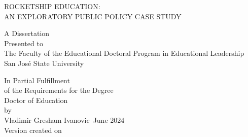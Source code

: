 
\begin{vplace}%
\begin{center}

  ROCKETSHIP EDUCATION:\\\vspace{1ex}
  AN EXPLORATORY PUBLIC POLICY CASE STUDY\\
\vspace{2\baselineskip}

A Dissertation\\
Presented to\\
The Faculty of the Educational Doctoral Program in Educational Leadership\\
San José State University\\
\vspace{2\baselineskip}

In Partial Fulfillment\\
of the Requirements for the Degree\\
Doctor of Education\\
\vspace{2\baselineskip}
by\\
Vladimir Gresham Ivanovic\
June 2024\\

\vspace{2\baselineskip}
Version \version{} created on \DTMnow%

\end{center}
\end{vplace}

\thispagestyle{empty}

